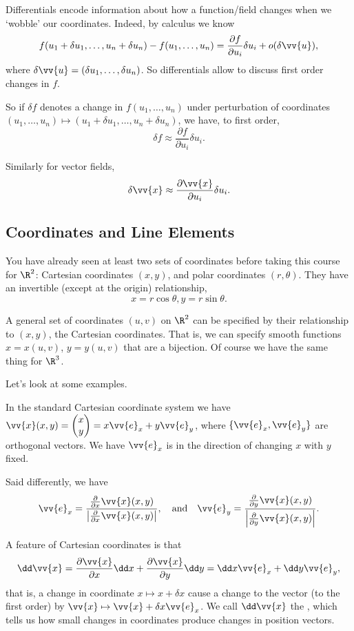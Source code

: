 Differentials encode information about how a function/field changes when we `wobble' our coordinates. Indeed, by calculus we know
$$
f(u_1 + \delta u_1, \dots, u_n + \delta u_n) - f(u_1, \dots, u_n) = \frac{\partial f}{\partial u_i} \delta u_i + o(\delta \vv{u}),
$$
where $\delta\vv{u} = (\delta u_1, \dots, \delta u_n)$. So differentials allow to discuss first order changes in $f$.

So if $\delta f$ denotes a change in $f(u_1, \dots, u_n)$ under perturbation of coordinates $(u_1, \dots, u_n) \mapsto (u_1 + \delta u_1, \dots, u_n + \delta u_n)$,  we have, to first order,
$$
\delta f \approx \frac{\partial f}{\partial u_i} \delta u_i.
$$

Similarly for vector fields,
$$
\delta \vv{x} \approx \frac{\partial \vv{x}}{\partial u_i} \delta u_i.
$$

\subsection{Coordinates and Line Elements}

You have already seen at least two sets of coordinates before taking this course for $\R^2$: Cartesian coordinates $(x, y)$, and polar coordinates $(r, \theta)$. They have an invertible (except at the origin) relationship,
$$
x = r \cos \theta, y = r \sin \theta.
$$


A general set of coordinates $(u, v)$ on $\R^2$ can be specified by their relationship to $(x, y)$, the Cartesian coordinates. That is, we can specify smooth functions $x = x(u, v)$, $y = y(u, v)$ that are a bijection. Of course we have the same thing for $\R^3$.

Let's look at some examples.

\begin{example}
In the standard Cartesian coordinate system we have $\vv{x}(x, y) = \begin{pmatrix}
	x \\ y
\end{pmatrix} = x \vv{e}_x + y \vv{e}_y$, where $\{\vv{e}_x, \vv{e}_y\}$ are orthogonal vectors. We have $\vv{e}_x$ is in the direction of changing $x$ with $y$ fixed.

Said differently, we have 
$$\vv{e}_x = \frac{\frac{\partial}{\partial x} \vv{x}(x, y)}{\left|\frac{\partial}{\partial x} \vv{x}(x, y)\right|}, \quad \text{and} \quad \vv{e}_y = \frac{\frac{\partial}{\partial y} \vv{x}(x, y)}{\left|\frac{\partial}{\partial y} \vv{x}(x, y)\right|}.$$

A feature of Cartesian coordinates is that
$$
\dd \vv{x} = \frac{\partial \vv{x}}{\partial x} \dd x + \frac{\partial \vv{x}}{\partial y} \dd y = \dd x \vv{e}_x + \dd y \vv{e}_y,
$$
that is, a change in coordinate $x \mapsto x + \delta x$ cause a change to the vector (to the first order) by $\vv{x} \mapsto \vv{x} + \delta x \vv{e}_x$. We call $\dd \vv{x}$ the , which tells us how small changes in coordinates produce changes in position vectors.
\end{example}

